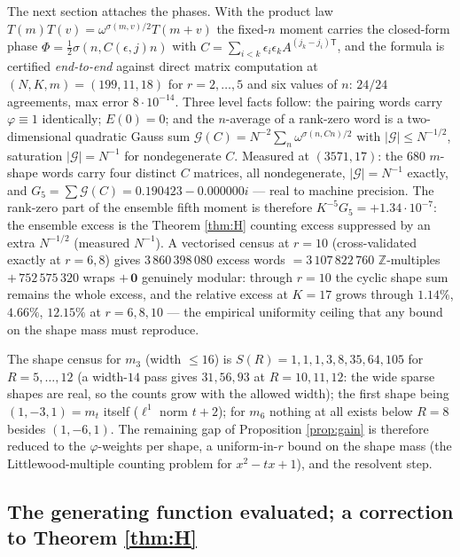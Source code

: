 \documentclass[11pt,reqno]{amsart}
\theoremstyle{definition}
\newcommand{\ZZ}{\mathbb{Z}}
\begin{document}
The next section attaches the phases.  With the product law
$T(m)T(v)=\omega^{\sigma(m,v)/2}T(m+v)$ the fixed-$n$ moment carries the
closed-form phase $\Phi=\frac12\sigma(n,C(\epsilon,j)n)$ with
$C=\sum_{i<k}\epsilon_i\epsilon_k A^{(j_k-j_i)\mathsf T}$, and the formula is
certified \emph{end-to-end} against direct matrix computation at
$(N,K,m)=(199,11,18)$ for $r=2,\dots,5$ and six values of $n$: $24/24$
agreements, max error $8\cdot10^{-14}$.  Three level facts follow: the
pairing words carry $\varphi\equiv1$ identically; $E(0)=0$; and the
$n$-average of a rank-zero word is a two-dimensional quadratic Gauss sum
$\mathcal G(C)=N^{-2}\sum_n\omega^{\sigma(n,Cn)/2}$ with
$|\mathcal G|\le N^{-1/2}$, saturation $|\mathcal G|=N^{-1}$ for
nondegenerate $C$.  Measured at $(3571,17)$: the $680$ $m$-shape words carry
four distinct $C$ matrices, all nondegenerate, $|\mathcal G|=N^{-1}$ exactly,
and $G_5=\sum\mathcal G(C)=0.190423-0.000000i$ --- real to machine precision.
The rank-zero part of the ensemble fifth moment is therefore
$K^{-5}G_5=+1.34\cdot10^{-7}$: the ensemble excess is the Theorem
\ref{thm:H} counting excess suppressed by an extra $N^{-1/2}$ (measured
$N^{-1}$).  A vectorised census at $r=10$ (cross-validated exactly at
$r=6,8$) gives $3\,860\,398\,080$ excess words $=3\,107\,822\,760$
$\ZZ$-multiples $+\,752\,575\,320$ wraps $+\,\mathbf 0$ genuinely modular:
through $r=10$ the cyclic shape sum remains the whole excess, and the
relative excess at $K=17$ grows through $1.14\%$, $4.66\%$, $12.15\%$ at
$r=6,8,10$ --- the empirical uniformity ceiling that any bound on the shape
mass must reproduce.

The shape census for $m_3$ (width $\le16$) is $S(R)=1,1,1,3,8,35,64,105$ for
$R=5,\dots,12$ (a width-$14$ pass gives $31,56,93$ at $R=10,11,12$: the wide
sparse shapes are real, so the counts grow with the allowed width); the first shape being $(1,-3,1)=m_t$ itself ($\ell^1$ norm
$t+2$); for $m_6$ nothing at all exists below $R=8$ besides $(1,-6,1)$.  The
remaining gap of Proposition \ref{prop:gain} is therefore reduced to the
$\varphi$-weights per shape, a uniform-in-$r$ bound on the shape mass (the
Littlewood-multiple counting problem for $x^2-tx+1$), and the resolvent step.

\subsection{The generating function evaluated; a correction to
Theorem \texorpdfstring{\ref{thm:H}}{H}}\label{sub:r80}
\end{document}
